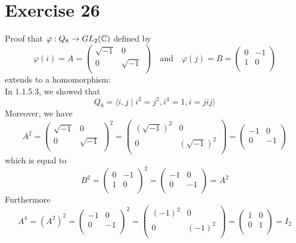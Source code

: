 \documentclass[12pt]{article}
\begin{document}
    \section*{Exercise 26}
    Proof that $\varphi: Q_8 \to GL_2(\mathbb{C})$ defined by
    \[  \varphi(i) = A =\begin{pmatrix}
        \sqrt{-1} & 0 \\
        0 & \sqrt{-1} \\
    \end{pmatrix}
    \quad \text{and} \quad
    \varphi(j) = B =\begin{pmatrix}
        0 & -1 \\
        1 & 0 \\
    \end{pmatrix} \]
    extends to a homomorphism: \\
    In 1.1.5.3, we showed that
    \[  Q_8 = \langle i, j \mid i^2 = j^2, i^4 = 1, i = jij \rangle \]
    Moreover, we have
    \[  A^2 = \begin{pmatrix}
        \sqrt{-1} & 0 \\
        0 & \sqrt{-1} \\
    \end{pmatrix}^2
    = \begin{pmatrix}
        (\sqrt{-1})^2 & 0 \\
        0 & (\sqrt{-1})^2 \\
    \end{pmatrix}
    = \begin{pmatrix}
        -1 & 0 \\
        0 & -1 \\
    \end{pmatrix} \]
    which is equal to
    \[  B^2 = \begin{pmatrix}
        0 & -1 \\
        1 & 0 \\
    \end{pmatrix}^2
    = \begin{pmatrix}
        -1 & 0 \\
        0 & -1 \\
    \end{pmatrix} = A^2 \]
    Furthermore
    \[  A^4 = (A^2)^2 = \begin{pmatrix}
        -1 & 0 \\
        0 & -1 \\
    \end{pmatrix}^2
    = \begin{pmatrix}
        (-1)^2 & 0 \\
        0 & (-1)^2 \\
    \end{pmatrix}
    = \begin{pmatrix}
        1 & 0 \\
        0 & 1 \\
    \end{pmatrix} = I_2 \]
\end{document}
